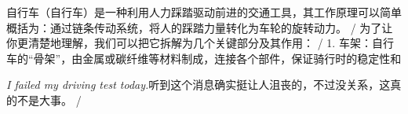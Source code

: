 \begin{multicols}{2}
自\allowbreak{}行\allowbreak{}车\allowbreak{}（\allowbreak{}自\allowbreak{}行\allowbreak{}车\allowbreak{}）\allowbreak{}是\allowbreak{}一\allowbreak{}\allowbreak{}种\allowbreak{}利\allowbreak{}用\allowbreak{}人\allowbreak{}力\allowbreak{}踩\allowbreak{}踏\allowbreak{}驱\allowbreak{}动\allowbreak{}前\allowbreak{}\allowbreak{}进\allowbreak{}的\allowbreak{}交\allowbreak{}通\allowbreak{}工\allowbreak{}具\allowbreak{}，\allowbreak{}其\allowbreak{}工\allowbreak{}作\allowbreak{}\allowbreak{}原\allowbreak{}理\allowbreak{}可\allowbreak{}以\allowbreak{}简\allowbreak{}单\allowbreak{}概\allowbreak{}括\allowbreak{}为\allowbreak{}：\allowbreak{}\allowbreak{}通\allowbreak{}过\allowbreak{}链\allowbreak{}条\allowbreak{}传\allowbreak{}动\allowbreak{}系\allowbreak{}统\allowbreak{}，\allowbreak{}将\allowbreak{}\allowbreak{}人\allowbreak{}的\allowbreak{}踩\allowbreak{}踏\allowbreak{}力\allowbreak{}量\allowbreak{}转\allowbreak{}化\allowbreak{}为\allowbreak{}车\allowbreak{}\allowbreak{}轮\allowbreak{}的\allowbreak{}旋\allowbreak{}转\allowbreak{}动\allowbreak{}力\allowbreak{}。\allowbreak{} / 为\allowbreak{}了\allowbreak{}让\allowbreak{}你\allowbreak{}更\allowbreak{}清\allowbreak{}楚\allowbreak{}地\allowbreak{}理\allowbreak{}解\allowbreak{}\allowbreak{}，\allowbreak{}我\allowbreak{}们\allowbreak{}可\allowbreak{}以\allowbreak{}把\allowbreak{}它\allowbreak{}拆\allowbreak{}解\allowbreak{}为\allowbreak{}\allowbreak{}几\allowbreak{}个\allowbreak{}关\allowbreak{}键\allowbreak{}部\allowbreak{}分\allowbreak{}及\allowbreak{}其\allowbreak{}作\allowbreak{}用\allowbreak{}\allowbreak{}：\allowbreak{} / 1. 车\allowbreak{}架\allowbreak{}：\allowbreak{}自\allowbreak{}行\allowbreak{}车\allowbreak{}的\allowbreak{}“骨\allowbreak{}架\allowbreak{}\allowbreak{}”，\allowbreak{}由\allowbreak{}金\allowbreak{}属\allowbreak{}或\allowbreak{}碳\allowbreak{}纤\allowbreak{}维\allowbreak{}等\allowbreak{}\allowbreak{}材\allowbreak{}料\allowbreak{}制\allowbreak{}成\allowbreak{}，\allowbreak{}连\allowbreak{}接\allowbreak{}各\allowbreak{}个\allowbreak{}部\allowbreak{}\allowbreak{}件\allowbreak{}，\allowbreak{}保\allowbreak{}证\allowbreak{}骑\allowbreak{}行\allowbreak{}时\allowbreak{}的\allowbreak{}稳\allowbreak{}定\allowbreak{}\allowbreak{}性\allowbreak{}和\allowbreak{}\par\noindent\textit{I failed my driving test today.}\enspace 听\allowbreak{}到\allowbreak{}这\allowbreak{}个\allowbreak{}消\allowbreak{}息\allowbreak{}确\allowbreak{}实\allowbreak{}挺\allowbreak{}让\allowbreak{}\allowbreak{}人\allowbreak{}沮\allowbreak{}丧\allowbreak{}的\allowbreak{}，\allowbreak{}不\allowbreak{}过\allowbreak{}没\allowbreak{}关\allowbreak{}系\allowbreak{}\allowbreak{}，\allowbreak{}这\allowbreak{}真\allowbreak{}的\allowbreak{}不\allowbreak{}是\allowbreak{}大\allowbreak{}事\allowbreak{}。\allowbreak{} / 
\end{multicols}
